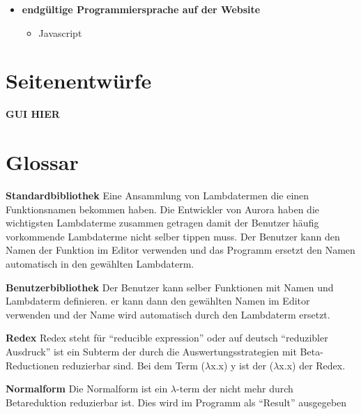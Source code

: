 \documentclass[parskip=full,11pt,twoside]{scrartcl}
\begin{document}
\begin{description}
\begin{itemize}
\begin{itemize}
			\end{itemize}
		\item \textbf{endgültige Programmiersprache auf der Website}
			\begin{itemize}
				\item Javascript
			\end{itemize}
	\end{itemize}
\newpage
\appendix
\end{description}
\section{Seitenentwürfe}
\textbf{GUI HIER}



\section{Glossar}

\textbf{Standardbibliothek}
Eine Ansammlung von Lambdatermen die einen Funktionsnamen bekommen haben. Die Entwickler von Aurora haben die wichtigsten Lambdaterme zusammen getragen damit der Benutzer häufig vorkommende Lambdaterme nicht selber tippen muss. Der Benutzer kann den Namen der Funktion im Editor verwenden und das Programm ersetzt den Namen automatisch in den gewählten Lambdaterm.

\textbf{Benutzerbibliothek}
Der Benutzer kann selber Funktionen mit Namen und Lambdaterm definieren. er kann dann den gewählten Namen im Editor verwenden und der Name wird automatisch durch den Lambdaterm ersetzt.

\textbf {Redex}
Redex steht für \enquote{reducible expression} oder auf deutsch \enquote{reduzibler Ausdruck} ist ein Subterm der durch die Auswertungsstrategien mit Beta-Reductionen reduzierbar sind.
Bei dem Term ($\lambda$x.x) y ist der ($\lambda$x.x) der Redex.

\textbf{Normalform}
Die Normalform ist ein $\lambda$-term der nicht mehr durch Betareduktion reduzierbar ist. Dies wird im Programm als \enquote{Result} ausgegeben
\end{document}
